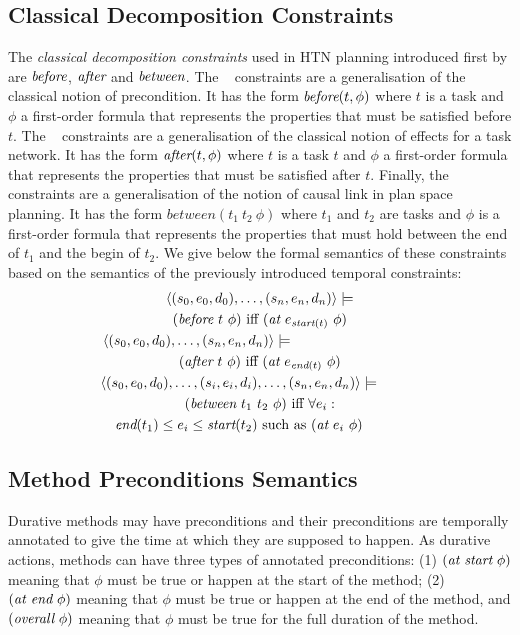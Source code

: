 \documentclass[letterpaper]{article} %
\newcommand{\at}{\text{\it at}}
\newcommand{\before}{\text{\it before}}
\newcommand{\after}{\text{\it after}}
\renewcommand{\between}{\text{\it between}}
\newcommand{\atstart}{\text{\it at start}}
\newcommand{\atend}{\text{\it at end}}
\newcommand{\overall}{\text{\it overall}}
\newcommand{\tstart}{\text{\it start}}
\newcommand{\tend}{\text{\it end}}
\begin{document}
\subsection{Classical Decomposition Constraints}

The {\em classical decomposition constraints} used in HTN planning introduced first by \citep{erol94} are $\before$, $\after$ and $\between$. The \before~ constraints are a generalisation of the classical notion of precondition. It has the form $\before(t, \phi)$ where $t$ is a task and $\phi$ a first-order formula that represents the properties that must be satisfied before $t$. The \after~ constraints are a generalisation of the classical notion of effects for a task network. It has the form $\after(t, \phi)$ where $t$ is a task $t$ and $\phi$ a first-order formula that represents the properties that must be satisfied after $t$. Finally, the \between~ constraints are a generalisation of the notion of causal link in plan space planning. It has the form $between(t_1\ t_2\ \phi)$ where $t_1$ and $t_2$ are tasks and $\phi$ is a first-order formula that represents the properties that must hold between the end of $t_1$ and the begin of $t_2$. We give below the formal semantics of these constraints based on the semantics of the previously introduced temporal constraints:
\begin{multline*}
\langle (s_0, e_0, d_0), \ldots, (s_n, e_n, d_n) \rangle \models  \\
(\before \ t \ \phi) \  \text{iff} \ (\at \ e_{\tstart(t)} \ \phi) \\
\langle (s_0, e_0, d_0), \ldots, (s_n, e_n, d_n) \rangle \models  \qquad \qquad \qquad \qquad \quad\\
(\after \ t \ \phi) \  \text{iff} \ (\at \ e_{\tend(t)} \ \phi) \\
\langle (s_0, e_0, d_0), \ldots, (s_i, e_i, d_i), \ldots, (s_n, e_n, d_n) \rangle \models \qquad \quad \\
    (\between \ t_1 \ t_2 \ \phi) \ \text{iff} \ \forall e_i :  \\
\tend(t_1) \leq e_i \leq \tstart(t_2) \ \text{such as} \ (\at \ e_i \ \phi) \qquad \quad
\end{multline*}

\subsection{Method Preconditions Semantics}

Durative methods may have preconditions and their preconditions are temporally annotated to give the time at which they are supposed to happen. As durative actions, methods can have three types of annotated preconditions: (1) $(\atstart \ \phi)$ meaning that $\phi$ must be true or happen at the start of the method; (2) $(\atend \ \phi)$ meaning that $\phi$ must be true or happen at the end of the method, and $(\overall \ \phi)$ meaning that $\phi$ must be true for the full duration of the method.
\end{document}
